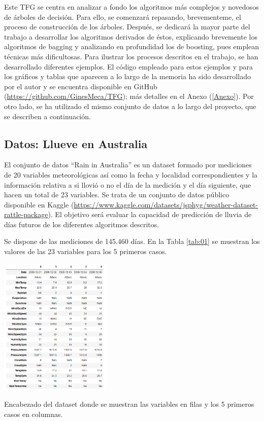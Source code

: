 \documentclass[12pt,twoside]{article}
\begin{document}
Este TFG se centra en analizar a fondo los algoritmos más complejos y novedosos de árboles de decisión. Para ello, se comenzará repasando, brevementeme, el proceso de construcción de los árboles. Después, se dedicará la mayor parte del trabajo a desarrollar los algoritmos derivados de éstos, explicando brevemente los algoritmos de bagging y analizando en profundidad los de boosting, pues emplean técnicas más dificultosas. Para ilustrar los procesos descritos en el trabajo, se han desarrollado diferentes ejemplos. El código empleado para estos ejemplos y para los gráficos y tablas que aparecen a lo largo de la memoria ha sido desarrollado por el autor y se encuentra disponible en GitHub (\url{https://github.com/GinesMeca/TFG}); más detalles en el Anexo (\ref{Anexo}). Por otro lado, se ha utilizado el mismo conjunto de datos a lo largo del proyecto, que se describen a continuación.



\subsection{Datos: Llueve en Australia} \label{sec: subsec11}

El conjunto de datos ``Rain in Australia'' es un dataset formado por mediciones de 20 variables meteorológicas así como la fecha y localidad correspondientes y la información relativa a si llovió o no el día de la medición y el día siguiente, que hacen un total de 23 variables. Se trata de un conjunto de datos público disponible en Kaggle (\url{https://www.kaggle.com/datasets/jsphyg/weather-dataset-rattle-package}). El objetivo será evaluar la capacidad de predicción de lluvia de días futuros de los diferentes algoritmos descritos.

Se dispone de las mediciones de 145.460 días. En la Tabla \ref{tab:01} se muestran los valores de las 23 variables para los 5 primeros casos.
\begin{table}[h]
	\centering
	\includegraphics[width = 0.4\textwidth]{Intro_01}
	\caption{Encabezado del dataset donde se muestran las variables en filas y los 5 primeros casos en columnas.}
	\label{tab:01}
\end{table}
\end{document}
